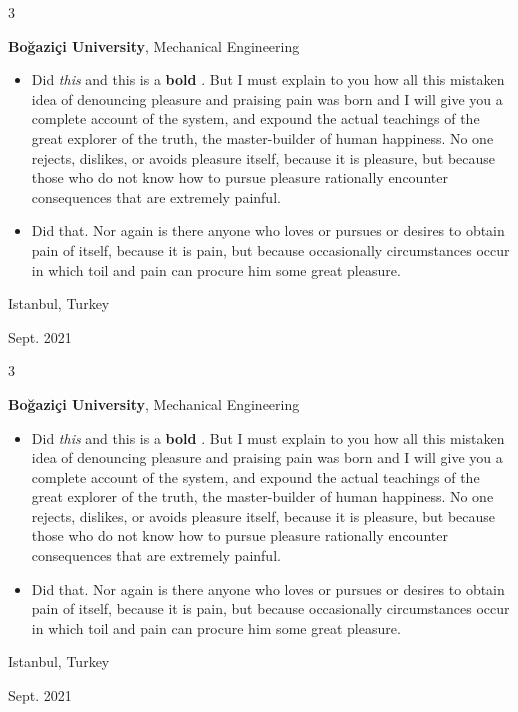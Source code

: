 \documentclass[10pt, letterpaper]{article}
\newenvironment{highlights}{
    \begin{itemize}[
        topsep=0.10 cm,
        parsep=0.10 cm,
        partopsep=0pt,
        itemsep=0pt,
        leftmargin=0.4 cm + 10pt
    ]
}{
    \end{itemize}
} %
\newenvironment{threecolentry}[3][]{
    \onecolentry
    \def\thirdColumn{#3}
    \setcolumnwidth{1 cm, \fill, 4.5 cm}
    \begin{paracol}{3}
    {\raggedright #2} \switchcolumn
}{
    \switchcolumn \raggedleft \thirdColumn
    \end{paracol}
    \endonecolentry
} %
\let\hrefWithoutArrow\href
\renewcommand{\href}[2]{\hrefWithoutArrow{#1}{\mbox{\ifthenelse{\equal{#2}{}}{ }{#2 }\raisebox{.15ex}{\footnotesize \faExternalLink*}}}}
\begin{document}
        \vspace{0.2 cm}

        \begin{threecolentry}{\textbf{}}{
            Istanbul, Turkey

        Sept. 2021
        }
            \textbf{Boğaziçi University}, Mechanical Engineering
            \begin{highlights}
                \item Did \textit{this} and this is a \textbf{bold} \href{https://example.com}{link}. But I must explain to you how all this mistaken idea of denouncing pleasure and praising pain was born and I will give you a complete account of the system, and expound the actual teachings of the great explorer of the truth, the master-builder of human happiness. No one rejects, dislikes, or avoids pleasure itself, because it is pleasure, but because those who do not know how to pursue pleasure rationally encounter consequences that are extremely painful.
                \item Did that. Nor again is there anyone who loves or pursues or desires to obtain pain of itself, because it is pain, but because occasionally circumstances occur in which toil and pain can procure him some great pleasure.
            \end{highlights}
        \end{threecolentry}

        \vspace{0.2 cm}

        \begin{threecolentry}{\textbf{}}{
            Istanbul, Turkey

        Sept. 2021
        }
            \textbf{Boğaziçi University}, Mechanical Engineering
            \begin{highlights}
                \item Did \textit{this} and this is a \textbf{bold} \href{https://example.com}{link}. But I must explain to you how all this mistaken idea of denouncing pleasure and praising pain was born and I will give you a complete account of the system, and expound the actual teachings of the great explorer of the truth, the master-builder of human happiness. No one rejects, dislikes, or avoids pleasure itself, because it is pleasure, but because those who do not know how to pursue pleasure rationally encounter consequences that are extremely painful.
                \item Did that. Nor again is there anyone who loves or pursues or desires to obtain pain of itself, because it is pain, but because occasionally circumstances occur in which toil and pain can procure him some great pleasure.
            \end{highlights}
        \end{threecolentry}
\end{document}
